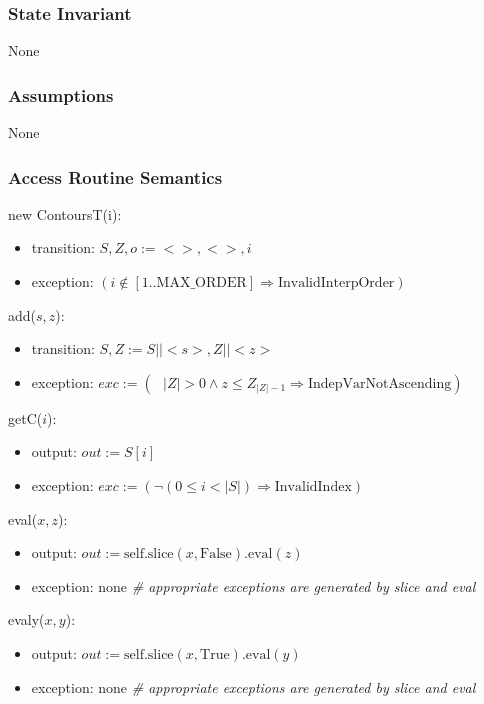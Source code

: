 \documentclass[12pt, titlepage]{article}
\begin{document}
\subsubsection {State Invariant}

None

\subsubsection {Assumptions}

None

\subsubsection {Access Routine Semantics}

new ContoursT(i):
\begin{itemize}
\item transition: $S, Z, o := < >, <>, i$
\item exception: $(i \notin [1..\mbox{MAX\_ORDER}] \Rightarrow \mbox{InvalidInterpOrder})$

\end{itemize}

\noindent add($s, z$):
\begin{itemize}
\item transition: $S, Z := S || <s>, Z || <z>$
\item exception: $exc := ( \mbox{ } |Z| > 0 \wedge z
  \leq Z_{|Z|-1} \Rightarrow \mbox{IndepVarNotAscending})$
\end{itemize}

\noindent getC($i$):
\begin{itemize}
\item output: $out := S[i]$
\item exception: $exc := (\neg(0 \leq i < |S|) \Rightarrow \mbox{InvalidIndex})$
\end{itemize}

\noindent eval($x, z$):
\begin{itemize}
\item output: $out := \mbox{self.slice}(x, \text{False}).\mbox{eval}(z)$
\item exception: none \textit{\# appropriate exceptions are generated by slice
    and eval}
\end{itemize}

\noindent evaly($x, y$):
\begin{itemize}
\item output: $out := \mbox{self.slice}(x, \text{True}).\mbox{eval}(y)$
\item exception: none \textit{\# appropriate exceptions are generated by slice
    and eval}
\end{itemize}
\end{document}

